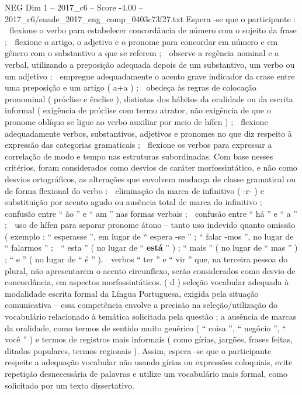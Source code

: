 \begin{textsample}{NEG Dim 1 – 2017\_c6 – Score -4.00 – 2017\_c6/enade\_2017\_eng\_comp\_0403c73f27.txt}
Espera -se que o participante :  flexione o verbo para estabelecer concordância de número com o sujeito da frase ;  flexione o artigo, o adjetivo e o pronome para concordar em número e em gênero com o substantivo a que se referem ;  observe a regência nominal e a verbal, utilizando a preposição adequada depois de um substantivo, um verbo ou um adjetivo ;  empregue adequadamente o acento grave indicador da crase entre uma preposição e um artigo ( a+a ) ;  obedeça às regras de colocação pronominal ( próclise e ênclise ), distintas dos hábitos da oralidade ou da escrita informal ( exigência de próclise com termo atrator, não exigência de que o pronome oblíquo se ligue ao verbo auxiliar por meio de hífen ) ;  flexione adequadamente verbos, substantivos, adjetivos e pronomes no que diz respeito à expressão das categorias gramaticais ;  flexione os verbos para expressar a correlação de modo e tempo nas estruturas subordinadas.
Com base nesses critérios, foram considerados como desvios de caráter morfossintático, e não como desvios ortográficos, as alterações que envolvem mudança de classe gramatical ou de forma flexional do verbo :  eliminação da marca de infinitivo ( -r- ) e substituição por acento agudo ou ausência total de marca do infinitivo ;  confusão entre “ ão ” e “ am ” nas formas verbais ;  confusão entre “ há ” e “ a ” ;  uso de hífen para separar pronome átono – tanto uso indevido quanto omissão ( exemplo : “ esperasse ”, em lugar de “ espera -se ” ; “ falar -mos ”, no lugar de “ falarmos ” ;  “ esta ” ( no lugar de “ \textbf{está} ” ) ; “ mais ” ( no lugar de “ mas ” ) ; “ e ” ( no lugar de “ é ” ).  verbos “ ter ” e “ vir ” que, na terceira pessoa do plural, não apresentarem o acento circunflexo, serão considerados como desvio de concordância, em aspectos morfossintáticos. ( d ) seleção vocabular adequada à modalidade escrita formal da Língua Portuguesa, exigida pela situação comunicativa – essa competência envolve a precisão na seleção/utilização do vocabulário relacionado à temática solicitada pela questão ; a ausência de marcas da oralidade, como termos de sentido muito genérico ( “ coisa ”, “ negócio ”, “ você ” ) e termos de registros mais informais ( como gírias, jargões, frases feitas, ditados populares, termos regionais ).
Assim, espera -se que o participante respeite a adequação vocabular não usando gírias ou expressões coloquiais, evite repetição desnecessária de palavras e utilize um vocabulário mais formal, como solicitado por um texto dissertativo.

\end{textsample}
